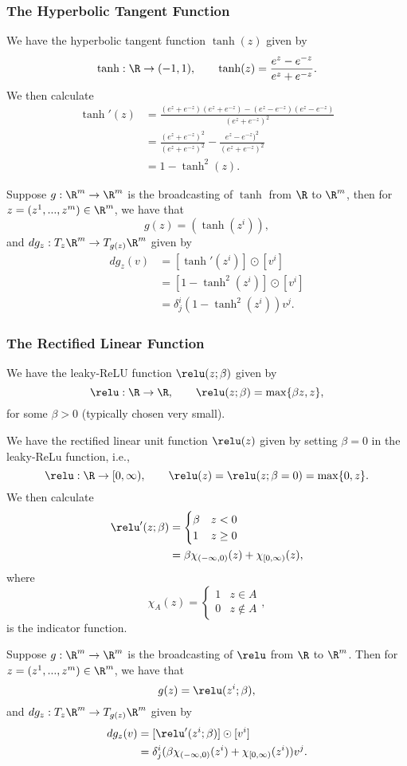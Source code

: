 \subsubsection{The Hyperbolic Tangent Function}
We have the hyperbolic tangent function $\tanh(z)$ given by
$$\tanh:\R\to(-1,1),\qquad\tanh(z)=\frac{e^z-e^{-z}}{e^z+e^{-z}}.$$
We then calculate
\begin{align*}
	\tanh'(z)&=\frac{(e^z+e^{-z})(e^z+e^{-z})-(e^z-e^{-z})(e^z-e^{-z})}{(e^z+e^{-z})^2}\\
	&=\frac{(e^z+e^{-z})^2}{(e^z+e^{-z})^2}-\frac{e^z-e^{-z})^2}{(e^z+e^{-z})^2}\\
	&=1-\tanh^2(z).
\end{align*}

Suppose $g:\R^m\to\R^m$ is the broadcasting of $\tanh$ from $\R$ to $\R^m$, then for $z=(z^1,...,z^m)\in\R^m$, we have that
$$g(z)=(\tanh(z^i)),$$
and $dg_z:T_z\R^m\to T_{g(z)}\R^m$ given by
\begin{align*}
	dg_z(v)&=[\tanh'(z^i)]\odot[v^i]\\
	&=[1-\tanh^2(z^i)]\odot[v^i]\\
	&=\delta^i_j(1-\tanh^2(z^i))v^j.
\end{align*}


\subsubsection{The Rectified Linear Function}
We have the leaky-ReLU function $\relu(z;\beta)$ given by
$$\relu:\R\to\R,\qquad \relu(z;\beta)=\max\{\beta z, z\},$$
for some $\beta>0$ (typically chosen very small).

We have the rectified linear unit function $\relu(z)$ given by setting $\beta=0$ in the leaky-ReLu function, i.e.,
$$\relu:\R\to[0,\infty),\qquad\relu(z)=\relu(z;\beta=0)=\max\{0,z\}.$$
We then calculate
\begin{align*}
	\relu'(z;\beta)&=\begin{cases}
		\beta&z<0\\
		1&z\geq0
	\end{cases}\\
	&=\beta\chi_{(-\infty,0)}(z)+\chi_{[0,\infty)}(z),
\end{align*}
where
$$\chi_A(z)=\begin{cases}
	1&z\in A\\
	0&z\notin A
\end{cases},$$
is the indicator function.

Suppose $g:\R^m\to\R^m$ is the broadcasting of $\relu$ from $\R$ to $\R^m$.   Then for $z=(z^1,...,z^m)\in\R^m$, we have that
$$g(z)=\relu(z^i;\beta),$$
and $dg_z:T_z\R^m\to T_{g(z)}\R^m$ given by
\begin{align*}
	dg_z(v)&=[\relu'(z^i;\beta)]\odot[v^i]\\
	&=\delta^i_j(\beta\chi_{(-\infty,0)}(z^i)+\chi_{[0,\infty)}(z^i))v^j.
\end{align*}


